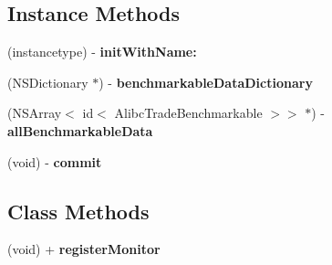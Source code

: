 \subsection*{Instance Methods}
\begin{DoxyCompactItemize}
\item 
\mbox{\label{interface_alibc_trade_monitor_abbc2b1649ba1bb7048bed3679e3d4edb}} 
(instancetype) -\/ {\bfseries init\+With\+Name\+:}
\item 
\mbox{\label{interface_alibc_trade_monitor_a49b15f812f42e7f801f9a47102505e51}} 
(N\+S\+Dictionary $\ast$) -\/ {\bfseries benchmarkable\+Data\+Dictionary}
\item 
\mbox{\label{interface_alibc_trade_monitor_aa87cb587e0bb6a768608aae9c722781b}} 
(N\+S\+Array$<$ id$<$ Alibc\+Trade\+Benchmarkable $>$$>$ $\ast$) -\/ {\bfseries all\+Benchmarkable\+Data}
\item 
\mbox{\label{interface_alibc_trade_monitor_a24d0327ce5d0e965f90d18a80e1bb838}} 
(void) -\/ {\bfseries commit}
\end{DoxyCompactItemize}
\subsection*{Class Methods}
\begin{DoxyCompactItemize}
\item 
\mbox{\label{interface_alibc_trade_monitor_a2b923b8d35c1d9fd6fb3e6d157d95de3}} 
(void) + {\bfseries register\+Monitor}
\end{DoxyCompactItemize}
